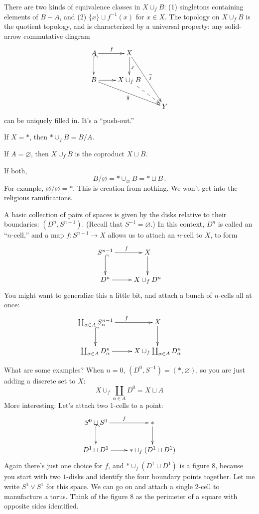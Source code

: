 There are two kinds of equivalence classes in $X\cup_fB$: (1) singletons containing elements of $B-A$, and (2) $\{x\}\sqcup f^{-1}(x)$ for $x\in X$.
The topology on $X\cup_fB$ is the quotient topology, and is characterized
by a universal property: any solid-arrow commutative diagram
\begin{equation*}
\xymatrix{A\ar[r]^f\ar@{^(->}[d] & X\ar[d]^j\ar[ddr]^{\overline{j}} & \\
B\ar[r]\ar[drr]_{\overline{g}} & X\cup_f B\ar@{-->}[dr] & \\
 & & Y}
\end{equation*}
can be uniquely filled in. It's a ``push-out.''
\begin{example}
If $X=\ast$, then $\ast\cup_f B=B/A$.
\end{example}
\begin{example}
If $A=\varnothing$, then $X\cup_fB$ is the coproduct $X\sqcup B$. 
\end{example}
\begin{example}
If both, 
\[
B/\varnothing=\ast\cup_\varnothing B=\ast\sqcup B\,.
\]
For example, $\varnothing/\varnothing=\ast$. 
This is creation from nothing. We won't get into the religious ramifications.
\end{example}
\begin{example}
A basic collection of pairs of spaces is given by the disks relative to their
boundaries: $(D^n,S^{n-1})$. (Recall that $S^{-1}=\varnothing$.) In this
context, $D^n$ is called an ``$n$-cell,'' and a map $f:S^{n-1}\to X$ allows
us to attach an $n$-cell to $X$, to form 
\begin{equation*}
\xymatrix{S^{n-1}\ar[r]^f\ar@{^(->}[d] & X\ar[d]\\
D^n\ar[r] & X\cup_f D^n}
\end{equation*}
You might want to generalize this a little bit, and attach a bunch of $n$-cells all at once:
\begin{equation*}
\xymatrix{\coprod_{\alpha\in A}S^{n-1}_\alpha\ar[r]^f\ar@{^(->}[d] & X\ar[d]\\
\coprod_{\alpha\in A}D^n_\alpha\ar[r] & X\cup_f \coprod_{\alpha\in A}D^n_\alpha}
\end{equation*}
\end{example}
What are some examples? When $n=0$, $(D^0,S^{-1})=(\ast,\varnothing)$, so 
you are just adding a discrete set to $X$:
\[
X\cup_f\coprod_{\alpha\in A}D^0=X\sqcup A
\]
More interesting: Let's attach two 1-cells to a point:
\begin{equation*}
\xymatrix{S^0\sqcup S^0\ar[r]^f\ar@{^(->}[d] & \ast\ar[d]\\
D^1\sqcup D^1\ar[r] & \ast\cup_f (D^1\sqcup D^1)}
\end{equation*}
Again there's just one choice for $f$, and 
$\ast\cup_f(D^1\sqcup D^1)$ is a figure $8$, because you start with 
two $1$-disks and identify the four boundary points together. Let me write 
$S^1\vee S^1$ for this space. We can go on and attach a single 2-cell to 
manufacture a torus. Think of the figure 8 as the perimeter of a square with opposite sides identified.

